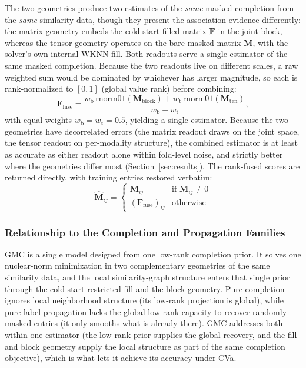 \documentclass[webpdf,modern,large]{oup-authoring-template}
\begin{document}
The two geometries produce two estimates of the \emph{same} masked completion from the \emph{same} similarity data, though they present the association evidence differently: the matrix geometry embeds the cold-start-filled matrix $\mathbf{F}$ in the joint block, whereas the tensor geometry operates on the bare masked matrix $\mathbf{M}$, with the solver's own internal WKNN fill. Both readouts serve a single estimator of the same masked completion. Because the two readouts live on different scales, a raw weighted sum would be dominated by whichever has larger magnitude, so each is rank-normalized to $[0,1]$ (global value rank) before combining:
\begin{equation}
\mathbf{F}_{\text{fuse}} = \frac{w_{\text{b}}\,\mathrm{rnorm01}(\mathbf{M}_{\text{block}}) + w_{\text{t}}\,\mathrm{rnorm01}(\mathbf{M}_{\text{ten}})}{w_{\text{b}}+w_{\text{t}}},
\label{eq:fusion}
\end{equation}
with equal weights $w_{\text{b}}=w_{\text{t}}=0.5$, yielding a single estimator. Because the two geometries have decorrelated errors (the matrix readout draws on the joint space, the tensor readout on per-modality structure), the combined estimator is at least as accurate as either readout alone within fold-level noise, and strictly better where the geometries differ most (Section~\ref{sec:results}). The rank-fused scores are returned directly, with training entries restored verbatim:
\begin{equation}
\hat{\mathbf{M}}_{ij} = \begin{cases}
\mathbf{M}_{ij} & \text{if } \mathbf{M}_{ij} \neq 0 \\
(\mathbf{F}_{\text{fuse}})_{ij} & \text{otherwise}
\end{cases}
\label{eq:restore}
\end{equation}

\subsubsection{Relationship to the Completion and Propagation Families}

GMC is a single model designed from one low-rank completion prior. It solves one nuclear-norm minimization in two complementary geometries of the same similarity data, and the local similarity-graph structure enters that single prior through the cold-start-restricted fill and the block geometry. Pure completion ignores local neighborhood structure (its low-rank projection is global), while pure label propagation lacks the global low-rank capacity to recover randomly masked entries (it only smooths what is already there). GMC addresses both within one estimator (the low-rank prior supplies the global recovery, and the fill and block geometry supply the local structure as part of the same completion objective), which is what lets it achieve its accuracy under CVa.
\end{document}
